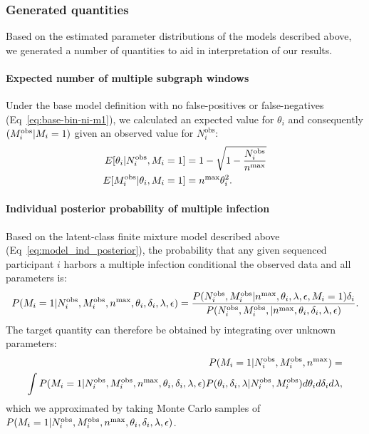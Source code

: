 \documentclass[10pt,letterpaper]{article}
\newcommand{\MI}{M^{\text{\text{obs}}}}
\begin{document}
\subsubsection{Generated quantities}
\setcounter{secnumdepth}{4}
Based on the estimated parameter distributions of the models described above, we generated a number of quantities to aid in interpretation of our results. 
\paragraph{Expected number of multiple subgraph windows}
Under the base model definition with no false-positives or false-negatives (Eq~\ref{eq:base-bin-ni-m1}), we calculated an expected value for $\theta_i$ and consequently $(\MI_i | M_i = 1)$ given an observed value for $N^{\text{obs}}_i$:
\begin{align}
   E[\theta_i | N^{\text{obs}}_i, M_i = 1] &= 1 - \sqrt{1-\frac{N^{\text{obs}}_i}{{n^{\text{max}}}}} \\
   E[\MI_i | \theta_i, M_i = 1] &= {n^{\text{max}}}\theta_i^2. 
   \label{eq:phi_MI_expectation}
\end{align}
\paragraph{Individual posterior probability of multiple infection}
Based on the latent-class finite mixture model described above (Eq~\ref{eq:model_ind_posterior}), the probability that any given sequenced participant $i$ harbors a multiple infection conditional the observed data and  all parameters is:
\begin{equation}
\label{eq:ind_conditional_prob_mi}
P(M_i = 1 | N^{\text{obs}}_i, \MI_i, {n^{\text{max}}}, \theta_i, \delta_i, \lambda, \epsilon) = \frac{P(N^{\text{obs}}_i, \MI_i | {n^{\text{max}}}, \theta_i, \lambda, \epsilon, M_i = 1)\delta_i}{P(N^{\text{obs}}_i, \MI_i, | {n^{\text{max}}}, \theta_i, \delta_i,  \lambda, \epsilon)}. 
\end{equation}
The target quantity can therefore be obtained by integrating over unknown parameters: 
\begin{equation}
\label{eq:ind_prob_mi}
\begin{split}
P(M_i = 1 | N^{\text{obs}}_i, \MI_i, {n^{\text{max}}}) = \\
\int P(M_i = 1 | N^{\text{obs}}_i, \MI_i, {n^{\text{max}}}, \theta_i, \delta_i, \lambda, \epsilon)P(\theta_i, \delta_i, \lambda | N^{\text{obs}}_i, \MI_i)d\theta_i d\delta_i d\lambda,
\end{split}
\end{equation}
which we approximated by taking Monte Carlo samples of $P(M_i = 1 | N^{\text{obs}}_i, \MI_i, {n^{\text{max}}}, \theta_i, \delta_i, \lambda, \epsilon)$. 
\end{document}
